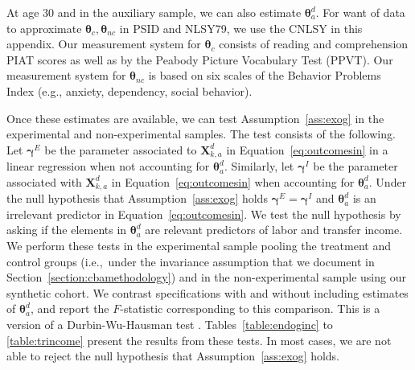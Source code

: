 \noindent At age 30 and in the auxiliary sample, we can also estimate $\bm{\theta}_{a}^d$. For want of data to approximate $\bm{\theta}_{c}, \bm{\theta}_{nc}$ in PSID and NLSY79, we use the CNLSY in this appendix. Our measurement system for $\bm{\theta}_{c}$ consists of reading and comprehension PIAT scores as well as by the Peabody Picture Vocabulary Test (PPVT). Our measurement system for $\bm{\theta}_{nc}$ is based on six scales of the Behavior Problems Index (e.g., anxiety, dependency, social behavior).

\noindent Once these estimates are available, we can test Assumption~\ref{ass:exog} in the experimental and non-experimental samples.  The test consists of the following. Let $\bm{\gamma}^E$ be the parameter associated to $\bm{X}^d_{k,a}$ in Equation~\eqref{eq:outcomesin} in a linear regression when not accounting for $\bm{\theta}_{a}^d$. Similarly, let $\bm{\gamma}^I$ be the parameter associated with $\bm{X}^d_{k,a}$ in Equation~\eqref{eq:outcomesin} when accounting for $\bm{\theta}_{a}^d$. Under the null hypothesis that Assumption~\ref{ass:exog} holds $\bm{\gamma}^E = \bm{\gamma}^I$ and $\bm{\theta}_{a}^d$ is an irrelevant predictor in Equation~\eqref{eq:outcomesin}. We test the null hypothesis by asking if the elements in $\bm{\theta}_{a}^d$ are relevant predictors of labor and transfer income. We perform these tests in the experimental sample pooling the treatment and control groups (i.e.,\ under the invariance assumption that we document in Section~\ref{section:cbamethodology}) and in the non-experimental sample using our synthetic cohort. We contrast specifications with and without including estimates of $\bm{\theta}_{a}^d$, and report the $F$-statistic corresponding to this comparison. This is a version of a Durbin-Wu-Hausman test \citep[see][]{Durbin_1954_RISI,Wu_1973_Econometrica,Hausman_1978_Econometrica}. Tables~\ref{table:endoginc} to \ref{table:trincome} present the results from these tests. In most cases, we are not able to reject the null hypothesis that Assumption~\ref{ass:exog} holds.

